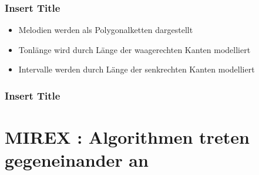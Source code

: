\documentclass{beamer}
\begin{document}
	\begin{frame}
        \frametitle{Insert Title}
        \begin{minipage}{0.45\textwidth}
            \begin{itemize}
             \item Melodien werden als Polygonalketten dargestellt
             \item Tonlänge wird durch Länge der waagerechten Kanten modelliert
             \item Intervalle werden durch Länge der senkrechten Kanten modelliert 
            \end{itemize}
        \end{minipage}
        \begin{minipage}{0.45\textwidth}
        \end{minipage}
	\end{frame}

	\begin{frame}
        \frametitle{Insert Title}
	\end{frame}






	\section{MIREX : Algorithmen treten gegeneinander an}
\end{document}
